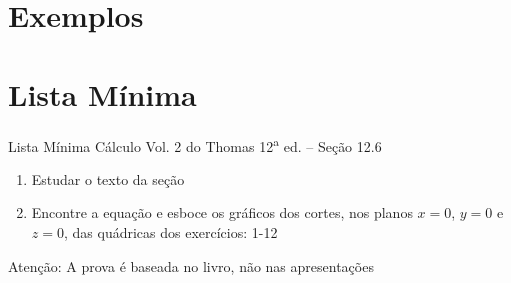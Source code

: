 \documentclass[fleqn,utf8,aspectratio=169,12pt]{beamer}
\begin{document}
\section{Exemplos}








\section{Lista Mínima}

\begin{frame}{Lista Mínima}
  Cálculo Vol. 2 do Thomas 12\textsuperscript{a} ed. -- Seção 12.6
  \begin{enumerate}
    \item Estudar o texto da seção
    \item Encontre a equação e esboce os gráficos dos cortes,
          nos planos $x=0$, $y=0$ e $z=0$, das quádricas dos exercícios: 1-12
  \end{enumerate}

  \vfill
  Atenção: A prova é baseada no livro, não nas apresentações
\end{frame}

\end{document}
